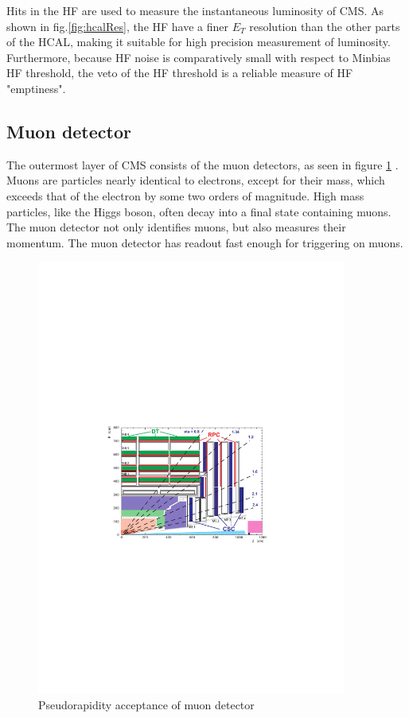 Hits in the HF are used to measure the instantaneous luminosity of CMS. As shown in fig.\ref{fig:hcalRes}, the HF have a finer $E_T$ resolution than the other parts of the HCAL, making it suitable for high precision measurement of luminosity. Furthermore, because HF noise is comparatively small with respect to Minbias HF threshold, the veto of the HF threshold is a reliable measure of HF "emptiness". 

\subsection{Muon detector}

The outermost layer of CMS consists of the muon detectors, as seen in figure \ref{fig:muonYZ} \cite{Bayatian:2006nff}. Muons are particles nearly identical to electrons, except for their mass, which exceeds that of the electron by some two orders of magnitude. High mass particles, like the Higgs boson, often decay into a final state containing muons. The muon detector not only identifies muons, but also measures their momentum. The muon detector has readout fast enough for triggering on muons.

\begin{figure}[h!]
\begin{centering}
\includegraphics[width=4in]{Chapter3/importfigs/Figure_001-006.pdf}
\par\end{centering}
\caption{Pseudorapidity acceptance of muon detector \cite{Bayatian:2006nff}\label{fig:muonYZ}}
\end{figure}


